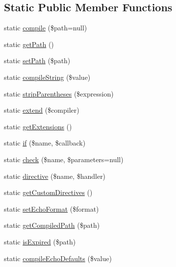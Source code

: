 \subsection*{Static Public Member Functions}
\begin{DoxyCompactItemize}
\item 
static \mbox{\hyperlink{class_illuminate_1_1_support_1_1_facades_1_1_blade_a0a45f9e95e5f3d63a18ad1c57612e340}{compile}} (\$path=null)
\item 
static \mbox{\hyperlink{class_illuminate_1_1_support_1_1_facades_1_1_blade_af4cd0ba1505bbd09031711afe52adfca}{get\+Path}} ()
\item 
static \mbox{\hyperlink{class_illuminate_1_1_support_1_1_facades_1_1_blade_a09e64db7dab97caa40885f701d76057d}{set\+Path}} (\$path)
\item 
static \mbox{\hyperlink{class_illuminate_1_1_support_1_1_facades_1_1_blade_ace0d9e04307ea31f761025a62b3e3155}{compile\+String}} (\$value)
\item 
static \mbox{\hyperlink{class_illuminate_1_1_support_1_1_facades_1_1_blade_ac29fff878c323d136f3d9aa334adf9e6}{strip\+Parentheses}} (\$expression)
\item 
static \mbox{\hyperlink{class_illuminate_1_1_support_1_1_facades_1_1_blade_a69d90db30c898c05a0c4b4b0c951af05}{extend}} (\$compiler)
\item 
static \mbox{\hyperlink{class_illuminate_1_1_support_1_1_facades_1_1_blade_ac5cb8f56b82091732182cd9bd2b84280}{get\+Extensions}} ()
\item 
static \mbox{\hyperlink{class_illuminate_1_1_support_1_1_facades_1_1_blade_a268e95c7f7190f897af20e1819568fd9}{if}} (\$name, \$callback)
\item 
static \mbox{\hyperlink{class_illuminate_1_1_support_1_1_facades_1_1_blade_aebc299d130bd96397a458dba3b583d63}{check}} (\$name, \$parameters=null)
\item 
static \mbox{\hyperlink{class_illuminate_1_1_support_1_1_facades_1_1_blade_a52ae58875eaccfaac5d6bc3bf9ae5952}{directive}} (\$name, \$handler)
\item 
static \mbox{\hyperlink{class_illuminate_1_1_support_1_1_facades_1_1_blade_ae7d3ff8509253bb984d96981a2d89226}{get\+Custom\+Directives}} ()
\item 
static \mbox{\hyperlink{class_illuminate_1_1_support_1_1_facades_1_1_blade_abe61a53debc94f487f169ba8f98cc1b7}{set\+Echo\+Format}} (\$format)
\item 
static \mbox{\hyperlink{class_illuminate_1_1_support_1_1_facades_1_1_blade_a9b2f060067fc407f0c0bd893a141d74f}{get\+Compiled\+Path}} (\$path)
\item 
static \mbox{\hyperlink{class_illuminate_1_1_support_1_1_facades_1_1_blade_adea1a1e9be278d6c8bab02c5c097e819}{is\+Expired}} (\$path)
\item 
static \mbox{\hyperlink{class_illuminate_1_1_support_1_1_facades_1_1_blade_a97fb22faf14e93f58b47796b199955ea}{compile\+Echo\+Defaults}} (\$value)
\end{DoxyCompactItemize}


